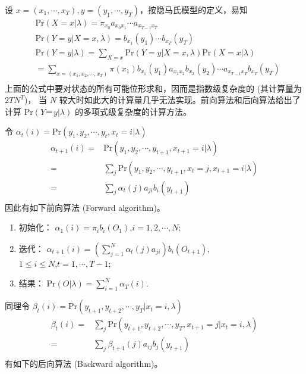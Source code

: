  设 $x=(x_{1},\cdots,x_{T}),y=(y_{1},\cdots,y_{T})$，按隐马氏模型的定义，易知
 $$
\begin{aligned}
 &\mbox{Pr}(X=x | \lambda)=\pi_{x_{0}}a_{x_{0}x_{1}}\cdots a_{x_{T-1}x_{T}}\\
 &\mbox{Pr}(Y=y | X=x,\lambda)=b_{x_{1}}(y_{1})\cdots b_{x_{T}}(y_{T})\\
 &\mbox{Pr}(Y=y |\lambda)=\sum\limits_{X=x}\mbox{Pr}(Y=y |X=x,\lambda)
            \mbox{Pr}(X=x | \lambda)\\
 &=\sum\limits_{x=(x_{1},x_{2},\cdots,x_{T})}
   \pi(x_{1})b_{x_{1}}(y_{1})
   a_{x_{1}x_{2}}b_{x_{2}}(y_{2})\cdots
   a_{x_{T-1}x_{T}}b_{x_{T}}(y_{T})\\
\end{aligned}
$$
上面的公式中要对状态的所有可能位形求和，因而是指数级复杂度的
(其计算量为 $2TN^{T}$)， 当 $N$
较大时如此大的计算量几乎无法实现。前向算法和后向算法给出了计算
$\mbox{Pr}(Y ＝ y |\lambda)$  的多项式级复杂度的计算方法。

令 $\alpha_{t}(i)=\mbox{Pr}(y_{1},y_{2},\cdots,y_{t},x_{t}=i |
\lambda)$
$$
\begin{aligned}
 \alpha_{t+1}(i)=&\mbox{Pr}(y_{1},y_{2},\cdots,y_{t+1},x_{t+1}=i | \lambda)\\
          =&\sum\limits_{j}\mbox{Pr}(y_{1},y_{2},\cdots,y_{t+1},
   x_{t}=j,x_{t+1}=i | \lambda)\\
      =&\sum\limits_{j}\alpha_{t}(j)a_{ji}b_{i}(y_{t+1})\\
\end{aligned}
$$
因此有如下前向算法 (Forward algorithm)。

\vspace*{\baselineskip} 
\begin{enumerate}
   \item  初始化： $\alpha_{1}(i)=\pi_{i}b_{i}(O_{1})$,\quad $i=1,2,\cdots,N$;\\
   \item  迭代： $\alpha_{t+1}(i)=(\sum\limits_{j=1}^{N}\alpha_{t}(j)a_{ji})b_{i}(O_{t+1})$,\\
                  \quad $1\leq i\leq N$,$t=1,\cdots,T-1$;\\
   \item   结果： $\mbox{Pr}(O |\lambda)=\sum\limits_{i=1}^{N}\alpha_{T}(i)$.
\end{enumerate}
 同理令 $\beta_{t}(i)=\mbox{Pr}(y_{t+1},y_{t+2},\cdots,y_{T} |x_{t}=i,\lambda)$
$$
\begin{aligned}
\beta_{t}(i)=&\sum\limits_{j}\mbox{Pr}(y_{t+1},y_{t+2},\cdots,y_{T},
   x_{t+1}=j |x_{t}=i,\lambda)\\
          =&\sum\limits_{j}\beta_{t+1}(j)a_{ij}b_{j}(y_{t+1})\\
\end{aligned}
$$
有如下的后向算法 (Backward algorithm)。

